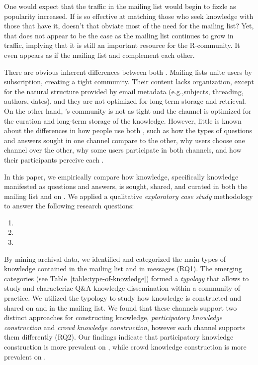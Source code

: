 One would expect that the traffic in the \RH mailing list would begin to fizzle as \SO popularity increased. If \SO is so effective at matching those who seek knowledge with those that have it, doesn't that obviate most of the need for the \RH mailing list? Yet, that does not appear to be the case as the \RH mailing list continues to grow in traffic, implying that it is still an important resource for the R-community. It even appears as if the mailing list and \SO complement each other.

There are obvious inherent differences between both \channels. Mailing lists unite users by subscription, creating a tight community. Their content lacks organization, except for the natural structure provided by email metadata (e.g.,subjects, threading, authors, dates), and they are not optimized for long-term storage and retrieval. On the other hand, \SO's community is not as tight and the channel is optimized for the curation and long-term storage of the knowledge. However, little is known about the differences in how people use both \channels, such as how the types of questions and answers sought in one channel compare to the other, why users choose one channel over the other, why some users participate in both channels, and how their participants perceive each \channel.



In this paper, we empirically compare how knowledge, specifically knowledge manifested as questions and answers, is sought, shared, and curated in both the \RH mailing list and on \SO. We applied a qualitative \textit{exploratory case study} methodology to answer the following research questions:

\begin{enumerate}[label=\bfseries{RQ\arabic*.},itemsep=3pt, topsep=2pt, leftmargin=3em, parsep=0pt]
        \item \rqa
        \item \rqb
        \item \rqc
    \end{enumerate}

By mining archival data, we identified and categorized the main types of knowledge contained in the \RH mailing list and in \SO messages (RQ1). The emerging categories (see Table~\ref{table:type-of-knowledge}) formed a \textit{typology} that allows to study and characterize Q\&A knowledge dissemination within a community of practice. We utilized the typology to study how knowledge is constructed and shared on \SO and in the \RH mailing list. We found that these channels support two distinct approaches for constructing knowledge, \textit{participatory knowledge construction} and \textit{crowd knowledge construction}, however each channel supports them differently (RQ2). Our findings indicate that participatory knowledge construction is more prevalent on \RH, while crowd knowledge construction is more prevalent on \SO.

